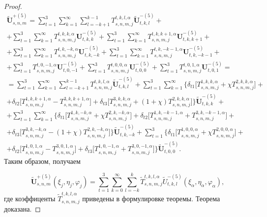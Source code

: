 \begin{russian}
\begin{proof}
\begin{multline}
\mathbf{\tilde U}_{s,n,m}^{+(5)}=\sum\limits_{t=1}^3\sum\limits_{k=1}^\infty\sum\limits_{l=-k+1}^{k-1}T_{s,n,m,j}^{t,k,l,\alpha}\mathbf{\tilde U}_{t,k,l}^{-(5)}+ \\
+\sum\limits_{t=1}^3\sum\limits_{k=1}^\infty T_{s,n,m,j}^{t,k,k,\alpha}\mathbf{U}_{t,k,k}^{-(5)}+\sum\limits_{t=1}^3\sum\limits_{k=1}^\infty T_{s,n,m,j}^{t,k,k+1,\alpha}\mathbf{U}_{t,k,k+1}^{-(5)}+ \\
+\sum\limits_{t=1}^3\sum\limits_{k=1}^\infty T_{s,n,m,j}^{t,k,-k,\alpha}\mathbf{U}_{t,k,-k}^{-(5)}+\sum\limits_{t=1}^3\sum\limits_{k=1}^\infty T_{s,n,m,j}^{t,k,-k-1,\alpha}\mathbf{U}_{t,k,-k-1}^{-(5)}+ \\
+\sum\limits_{t=1}^3 T_{s,n,m,j}^{t,0,-1,\alpha}\mathbf{U}_{t,0,-1}^{-(5)}+\sum\limits_{t=1}^3 T_{s,n,m,j}^{t,0,0,\alpha}\mathbf{U}_{t,0,0}^{-(5)}+\sum\limits_{t=1}^3 T_{s,n,m,j}^{t,0,1,\alpha}\mathbf{U}_{t,0,1}^{-(5)}= \\
=\sum\limits_{t=1}^3\sum\limits_{k=1}^\infty\sum\limits_{l=-k+1}^{k-1}T_{s,n,m,j}^{t,k,l,\alpha}\mathbf{\tilde U}_{t,k,l}^{-(5)}+\sum\limits_{t=1}^3\sum\limits_{k=1}^\infty\bigg\{\delta_{t1}\bigg\lbrack T_{s,n,m,j}^{1,k,k,\alpha}+\chi T_{s,n,m,j}^{2,k,k,\alpha}\bigg\rbrack+ \\
+\delta_{t2}\bigg\lbrack T_{s,n,m,j}^{1,k,k+1,\alpha}-T_{s,n,m,j}^{3,k,k+1,\alpha}\bigg\rbrack+\delta_{t3}\bigg\lbrack T_{s,n,m,j}^{3,k,k,\alpha}+(1+\chi)T_{s,n,m,j}^{2,k,k,\alpha}\bigg\rbrack\bigg\}\mathbf{\tilde U}_{t,k,k}^{-(5)}+ \\
+\sum\limits_{t=1}^3\sum\limits_{k=1}^\infty\bigg\{\delta_{t1}\bigg\lbrack T_{s,n,m,j}^{1,k,-k,\alpha}+\chi T_{s,n,m,j}^{2,k,-k,\alpha}\bigg\rbrack+\delta_{t2}\bigg\lbrack T_{s,n,m,j}^{1,k,-k-1,\alpha}+T_{s,n,m,j}^{3,k,-k-1,\alpha}\bigg\rbrack+ \\
+\delta_{t3}\bigg\lbrack T_{s,n,m,j}^{3,k,-k,\alpha}-(1+\chi)T_{s,n,m,j}^{2,k,-k,\alpha}\bigg\rbrack\bigg\}\mathbf{\tilde U}_{t,k,-k}^{-(5)}+
\sum\limits_{t=1}^3\bigg\{\delta_{t1}\bigg\lbrack T_{s,n,m,j}^{1,0,0,\alpha}+\chi T_{s,n,m,j}^{2,0,0,\alpha}\bigg\rbrack+ \\
+\delta_{t2}\bigg\lbrack T_{s,n,m,j}^{1,0,1,\alpha}-T_{s,n,m,j}^{3,0,1,\alpha}\bigg\rbrack+\delta_{t3}\bigg\lbrack T_{s,n,m,j}^{1,0,-1,\alpha}+T_{s,n,m,j}^{3,0,-1,\alpha}\bigg\rbrack\bigg\}\mathbf{\tilde U}_{t,0,0}^{-(5)}.
\label{eq:1:121p}
\end{multline}
Таким образом, получаем

\begin{equation}
\mathbf{\tilde U}_{s,n,m}^{+(5)}(\xi_j,\eta_j,\varphi_j)=\sum\limits_{t=1}^3\sum\limits_{k=0}^\infty\sum\limits_{l=-k}^k\tilde T_{s,n,m,j}^{t,k,l,\alpha}\tilde U_{t,k,l}^{-(5)}(\xi_\alpha,\eta_\alpha,\varphi_\alpha),
\label{eq:1:122p}
\end{equation}
где коэффиценты $\tilde T_{s,n,m,j}^{t,k,l,\alpha}$ приведены в формулировке теоремы. Теорема доказана.
\end{proof}


\end{russian}
